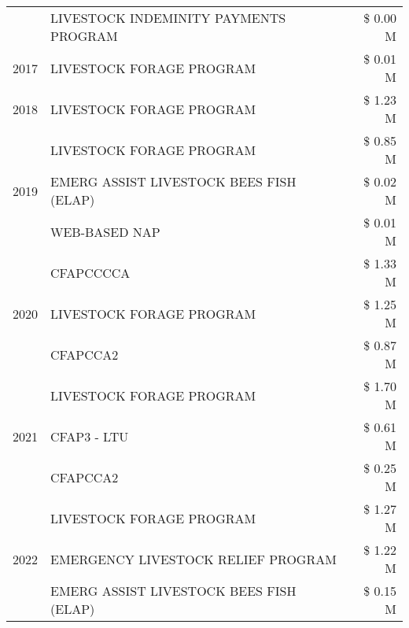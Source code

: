 \begin{tabular}{llr}
 & LIVESTOCK INDEMINITY PAYMENTS PROGRAM & \$ 0.00 M \\
\cline{1-3}
2017 & LIVESTOCK FORAGE PROGRAM & \$ 0.01 M \\
\cline{1-3}
2018 & LIVESTOCK FORAGE PROGRAM & \$ 1.23 M \\
\cline{1-3}
\multirow[t]{3}{*}{2019} & LIVESTOCK FORAGE PROGRAM & \$ 0.85 M \\
 & EMERG ASSIST LIVESTOCK BEES FISH (ELAP) & \$ 0.02 M \\
 & WEB-BASED NAP & \$ 0.01 M \\
\cline{1-3}
\multirow[t]{3}{*}{2020} & CFAPCCCCA & \$ 1.33 M \\
 & LIVESTOCK FORAGE PROGRAM & \$ 1.25 M \\
 & CFAPCCA2 & \$ 0.87 M \\
\cline{1-3}
\multirow[t]{3}{*}{2021} & LIVESTOCK FORAGE PROGRAM & \$ 1.70 M \\
 & CFAP3 - LTU & \$ 0.61 M \\
 & CFAPCCA2 & \$ 0.25 M \\
\cline{1-3}
\multirow[t]{3}{*}{2022} & LIVESTOCK FORAGE PROGRAM & \$ 1.27 M \\
 & EMERGENCY LIVESTOCK RELIEF PROGRAM & \$ 1.22 M \\
 & EMERG ASSIST LIVESTOCK BEES FISH (ELAP) & \$ 0.15 M \\
\cline{1-3}
\bottomrule
\end{tabular}
